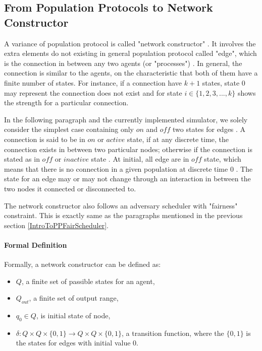 \subsection{From Population Protocols to Network Constructor \cite{MS16a}}

\par\noindent
A variance of population protocol is called "network constructor" \cite{MS16a}.
It involves the extra elements do not existing in general population protocol called "edge", which is
the connection in between any two agents (or "processes") \cite{MS16a}. In general, the connection
is similar to the agents, on the characteristic that both of them have a finite number of states. For instance, if
a connection have $k + 1$ states,  state 0 may represent the connection does not exist and for state $i \in \{1,2,3, ..., k\}$
shows the strength for a particular connection.


\par\noindent
In the following paragraph and the currently implemented simulator, we solely consider the simplest
case containing only $on$ and $off$ two states for edges  \cite{MS16a}. A connection is said to be in
$on$ or $active$ state, if at any discrete time, the connection exists in between two
particular nodes; otherwise if the connection is stated as in $off$ or $inactive$ state  \cite{MS16a}.
At initial, all edge are in $off$ state, which means that there is no connection in a given
population at discrete time 0  \cite{MS16a}. The state for an edge may or may not change through an interaction
in between the two nodes it connected or disconnected to.


\par\noindent
The network constructor also follows an adversary scheduler with "fairness" constraint. This is
exactly same as the paragraphs mentioned in the previous section \ref{IntroToPPFairScheduler}.

\paragraph{Formal Definition \cite{MS16a}}
Formally, a network constructor can be defined as:
\begin{itemize}
  \item $Q$, a finite set of passible states for an agent,
  \item $Q_{out}$, a finite set of output range,
  \item $q_{0} \in Q $, is initial state of node,
  \item $\delta: Q \times Q \times \{0,1\} \to Q \times Q \times \{0,1\}$, a transition function, where the $\{0,1\}$ is the states for edges with initial value 0.
\end{itemize}


